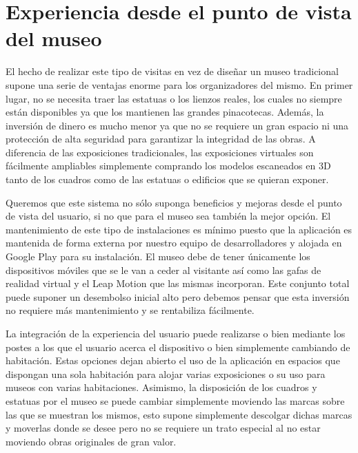 \documentclass[a4paper,11pt]{article}
\begin{document}
\section{Experiencia desde el punto de vista del museo}
El hecho de realizar este tipo de visitas en vez de diseñar un museo tradicional supone una serie de ventajas enorme para los organizadores del mismo. En primer lugar, no se necesita traer las estatuas o los lienzos reales, los cuales no siempre están disponibles ya que los mantienen las grandes pinacotecas. Además, la inversión de dinero es mucho menor ya que no se requiere un gran espacio ni una protección de alta seguridad para garantizar la integridad de las obras. A diferencia de las exposiciones tradicionales, las exposiciones virtuales son fácilmente ampliables simplemente comprando los modelos escaneados en 3D tanto de los cuadros como de las estatuas o edificios que se quieran exponer.

\vspace{10px}

Queremos que este sistema no sólo suponga beneficios y mejoras desde el punto de vista del usuario, si no que para el museo sea también la mejor opción. El mantenimiento de este tipo de instalaciones es mínimo puesto que la aplicación es mantenida de forma externa por nuestro equipo de desarrolladores y alojada en Google Play para su instalación. El museo debe de tener únicamente los dispositivos móviles que se le van a ceder al visitante así como las gafas de realidad virtual y el Leap Motion que las mismas incorporan. Este conjunto total puede suponer un desembolso inicial alto pero debemos pensar que esta inversión no requiere más mantenimiento y se rentabiliza fácilmente.

\vspace{10px}

La integración de la experiencia del usuario puede realizarse o bien mediante los postes a los que el usuario acerca el dispositivo o bien simplemente cambiando de habitación. Estas opciones dejan abierto el uso de la aplicación en espacios que dispongan una sola habitación para alojar varias exposiciones o su uso para museos con varias habitaciones. Asimismo, la disposición de los cuadros y estatuas por el museo se puede cambiar simplemente moviendo las marcas sobre las que se muestran los mismos, esto supone simplemente descolgar dichas marcas y moverlas donde se desee pero no se requiere un trato especial al no estar moviendo obras originales de gran valor.

\vspace{10px}
\end{document}
